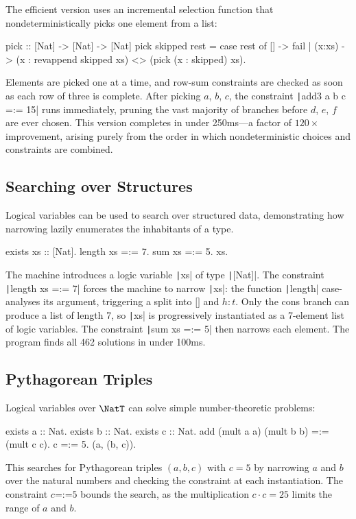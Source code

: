 The efficient version uses an incremental selection function that
nondeterministically picks one element from a list:
%
\begin{haskellcode}
pick :: [Nat] -> [Nat] -> [Nat]
pick skipped rest = case rest of
    [] -> fail
  | (x:xs) -> (x : revappend skipped xs)
              <> (pick (x : skipped) xs).
\end{haskellcode}
%
\noindent Elements are picked one at a time, and row-sum constraints are checked
as soon as each row of three is complete. After picking $a$, $b$, $c$, the
constraint \texttt|add3 a b c =:= 15| runs immediately, pruning
the vast majority of branches before $d$, $e$, $f$ are ever chosen. This
version completes in under 250ms---a factor of $120\times$ improvement, arising
purely from the order in which nondeterministic choices and constraints are
combined.

\subsection{Searching over Structures}

Logical variables can be used to search over structured data, demonstrating how
narrowing lazily enumerates the inhabitants of a type.
%
\begin{haskellcode}
exists xs :: [Nat]. length xs =:= 7. sum xs =:= 5. xs.
\end{haskellcode}
%
\noindent The machine introduces a logic variable \texttt|xs| of
type \texttt|[Nat]|. The constraint
\texttt|length xs =:= 7| forces the machine to narrow
\texttt|xs|: the function \texttt|length|
case-analyses its argument, triggering a split into $\texttt{[]}$ and
$h : t$. Only the cons branch can produce a list of length 7, so
\texttt|xs| is progressively instantiated as a 7-element list of
logic variables. The constraint \texttt|sum xs =:= 5| then narrows
each element. The program finds all 462 solutions in under 100ms.

\subsection{Pythagorean Triples}

Logical variables over $\NatT$ can solve simple number-theoretic problems:
%
\begin{haskellcode}
exists a :: Nat. exists b :: Nat. exists c :: Nat.
add (mult a a) (mult b b) =:= (mult c c).
c =:= 5.
(a, (b, c)).
\end{haskellcode}
%
\noindent This searches for Pythagorean triples $(a, b, c)$ with $c = 5$ by
narrowing $a$ and $b$ over the natural numbers and checking the constraint at
each instantiation. The constraint $c \mathbin{\texttt{=:=}} 5$ bounds the
search, as the multiplication $c \cdot c = 25$ limits the range of $a$ and $b$.

